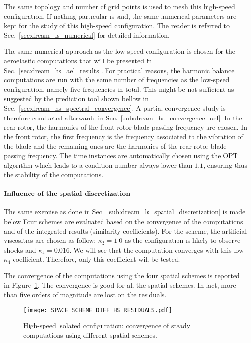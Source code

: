 
The same topology and number of grid points is used to
mesh this high-speed configuration. 
If nothing particular is said, the same numerical parameters
are kept for the study of this
high-speed configuration.
The reader is referred to 
Sec.~\ref{sec:dream_ls_numerical} for detailed information.

The same numerical approach as the low-speed configuration
is chosen for the aeroelastic computations that will
be presented in
Sec.~\ref{sec:dream_hs_ael_results}.
For practical reasons, the harmonic balance computations are run with
the same number of frequencies as the low-speed configuration,
namely five frequencies in total. This might be not sufficient
as suggested by the prediction tool shown bellow in 
Sec.~\ref{sec:dream_hs_spectral_convergence}. A partial 
convergence study is therefore conducted afterwards 
in Sec.~\ref{sub:dream_hs_convergence_ael}.
In the rear rotor,
the harmonics of the front rotor blade passing frequency
are chosen. In the front rotor, the first frequency is the
frequency associated to the vibration of the blade and the
remaining ones are the harmonics of the rear rotor blade 
passing frequency. 
The time instances are automatically chosen using the OPT
algorithm which leads to 
a condition number always lower than $1.1$, ensuring thus
the stability of the computations.

\paragraph{Influence of the spatial discretization}
\label{sub:dream_hs_spatial_discretization}

The same exercise as done in 
Sec.~\ref{sub:dream_ls_spatial_discretization} is made below
Four schemes are evaluated based 
on the convergence of the computations
and of the integrated 
results (similarity coefficients).
For the \citet{Jameson1981} scheme, the artificial viscosities
are chosen as follow: $\kappa_2 = 1.0$ as the configuration is likely to 
observe shocks and $\kappa_4 = 0.016$. We will see that the computation converges
with this low $\kappa_4$ coefficient. Therefore, only this coefficient
will be tested.

The convergence of the computations using the four spatial schemes
is reported in Figure~\ref{fig:DREAM_HS_RESIDUALS_PPT}. The convergence is good
for all the spatial schemes. In fact, more than five orders of magnitude
are lost on the residuals.
\begin{figure}[htp]
  \centering
  \texttt{[image: SPACE\_SCHEME\_DIFF\_HS\_RESIDUALS.pdf]}
  \caption{High-speed isolated configuration: convergence 
  of steady computations using different spatial schemes.}
  \label{fig:DREAM_HS_RESIDUALS_PPT}
\end{figure}

